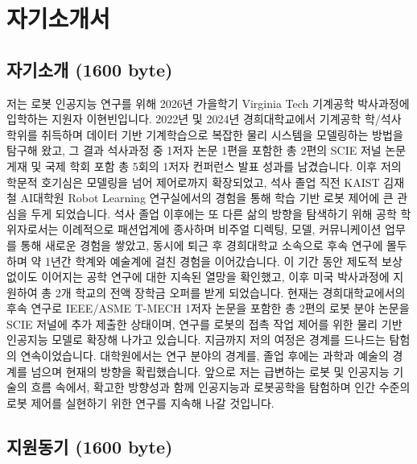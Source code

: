 \documentclass{article}
\begin{document}
\section{자기소개서}

\subsection{자기소개 (1600 byte)}

저는 로봇 인공지능 연구를 위해 2026년 가을학기 Virginia Tech 기계공학 박사과정에 입학하는 지원자 이현빈입니다. 2022년 및 2024년 경희대학교에서 기계공학 학/석사 학위를 취득하며 데이터 기반 기계학습으로 복잡한 물리 시스템을 모델링하는 방법을 탐구해 왔고, 그 결과 석사과정 중 1저자 논문 1편을 포함한 총 2편의 SCIE 저널 논문 게재 및 국제 학회 포함 총 5회의 1저자 컨퍼런스 발표 성과를 남겼습니다. 이후 저의 학문적 호기심은 모델링을 넘어 제어로까지 확장되었고, 석사 졸업 직전 KAIST 김재철 AI대학원 Robot Learning 연구실에서의 경험을 통해 학습 기반 로봇 제어에 큰 관심을 두게 되었습니다. 석사 졸업 이후에는 또 다른 삶의 방향을 탐색하기 위해 공학 학위자로서는 이례적으로 패션업계에 종사하며 비주얼 디렉팅, 모델, 커뮤니케이션 업무를 통해 새로운 경험을 쌓았고, 동시에 퇴근 후 경희대학교 소속으로 후속 연구에 몰두하며 약 1년간 학계와 예술계에 걸친 경험을 이어갔습니다. 이 기간 동안 제도적 보상 없이도 이어지는 공학 연구에 대한 지속된 열망을 확인했고, 이후 미국 박사과정에 지원하여 총 2개 학교의 전액 장학금 오퍼를 받게 되었습니다. 현재는 경희대학교에서의 후속 연구로 IEEE/ASME T-MECH 1저자 논문을 포함한 총 2편의 로봇 분야 논문을 SCIE 저널에 추가 제출한 상태이며, 연구를 로봇의 접촉 작업 제어를 위한 물리 기반 인공지능 모델로 확장해 나가고 있습니다. 지금까지 저의 여정은 경계를 드나드는 탐험의 연속이었습니다. 대학원에서는 연구 분야의 경계를, 졸업 후에는 과학과 예술의 경계를 넘으며 현재의 방향을 확립했습니다. 앞으로 저는 급변하는 로봇 및 인공지능 기술의 흐름 속에서, 확고한 방향성과 함께 인공지능과 로봇공학을 탐험하며 인간 수준의 로봇 제어를 실현하기 위한 연구를 지속해 나갈 것입니다.


\subsection{지원동기 (1600 byte)}
\end{document}
